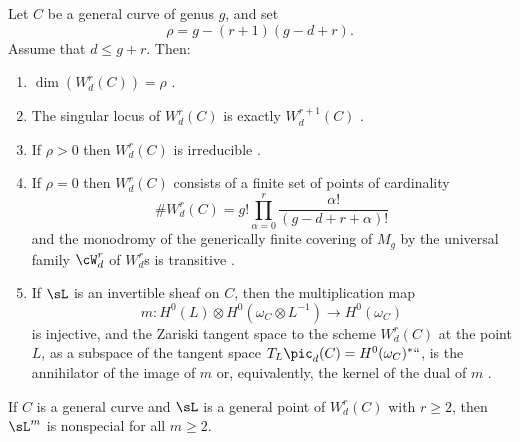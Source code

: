 \begin{theorem}\label{Wrd omnibus}
Let $C$ be a general curve of genus $g$,
and set
$$\rho = g - (r+1)(g-d+r).$$
Assume that $d \leq g+r$. Then:
\begin{enumerate}

\item $\dim(W^r_d(C)) = \rho$
{\rm\cite{Griffiths-Harris-BN}}.
\label{GH}

\item\label{sing wrd} The singular locus of $W^r_d(C)$ is exactly
$W^{r+1}_d(C)$
{\rm\cite{Gieseker-Petri,Lazarsfeld-Petri}}.
\label{irr wrd}

\item If $\rho > 0$ then $W^r_d(C)$ is irreducible
%
%
%
{\rm\cite{MR611386}}.

\item\label{rho=0} If $\rho = 0$ then $W^r_d(C)$ consists of a finite
set of  points of cardinality
$$
\#W^r_d(C) = g! \prod_{\alpha=0}^r \frac{\alpha!}{(g-d+r+\alpha)!}
$$
and the monodromy of the generically finite covering of  $M_g$ by the
universal family
$\cW^r_d$ of $W^r_d$s is transitive
{\rm\cite{zbMATH04014883}}.

\item\label{Petri} If  $\sL$ is an invertible sheaf on $C$, then the
multiplication map
$$
m : H^0(L) \otimes H^0(\omega_C\otimes L^{-1}) \to H^0(\omega_C)
$$
is injective, and the Zariski tangent space to the scheme $W^r_d(C)$
at the point $L$, as a subspace
of the tangent space $T_L\pic_d(C) = H^0(\omega_C)^*` `$, is the
annihilator of the image of $m$
or, equivalently, the kernel of the dual of $m$
{\rm\cite{Gieseker-Petri}}.
\end{enumerate}
\end{theorem}

\begin{corollary}\label{2L nonspecial}
If $C$ is a general curve and $\sL$ is a general point of $W^r_d(C)$
with $r\geq 2$,
 then $\sL^m$ is nonspecial for all $m \geq 2$.
%
\end{corollary}


